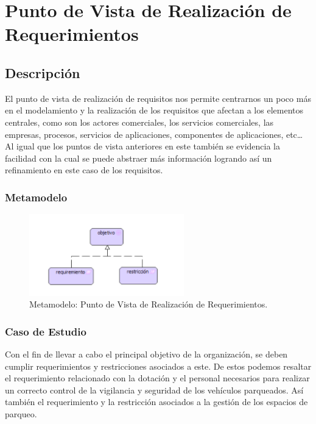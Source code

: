 \section{Punto de Vista de Realización de Requerimientos}
\subsection{Descripción}
El punto de vista de realización de requisitos nos permite centrarnos un poco más en el modelamiento y la realización de los requisitos que afectan a los elementos centrales, como son los actores comerciales, los servicios comerciales, las empresas, procesos, servicios de aplicaciones, componentes de aplicaciones, etc… Al igual que los puntos de vista anteriores en este también se evidencia la facilidad con la cual se puede abstraer más información logrando así un refinamiento en este caso de los requisitos.

\subsubsection{Metamodelo}
\begin{figure}[h]
	\centering
	\includegraphics[width=0.6\textwidth]{imagenes/Metamodelos/Motivacion/meta_Realizacion_Requerimientos.pdf}
	\caption{Metamodelo: Punto de Vista de Realización de Requerimientos.}
	\label{fig:gap_analysis}
\end{figure}

\subsubsection{Caso de Estudio}
Con el fin de llevar a cabo el principal objetivo de la organización, se deben cumplir requerimientos y restricciones asociados a este. De estos podemos resaltar el requerimiento relacionado con la dotación y el personal necesarios para realizar un correcto control de la vigilancia y seguridad de los vehículos parqueados. Así también el requerimiento y la restricción asociados a la gestión de los espacios de parqueo.

